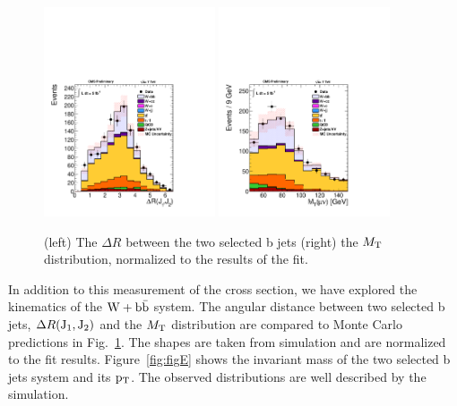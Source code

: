 
\begin{figure}
\centering
\includegraphics[width=0.45\textwidth]{Wbb/fig5.pdf}
\includegraphics[width=0.45\textwidth]{Wbb/fig6.pdf}
\caption{(left) The $\Delta R$ between the two selected b jets
(right) the $M_\mathrm{T}$ distribution, normalized to the results of the fit.}
\label{fig:figD}
\end{figure}

In addition to this measurement of the cross section, we have explored the kinematics of the $\mathrm{W+\mathrm{b\bar{b}}}$ system.
The angular distance between two selected b jets, $\Delta R(\rm{J_1,J_2})$ 
and the $M_\mathrm{T}$ distribution are compared to Monte Carlo predictions 
in Fig.~\ref{fig:figD}. The shapes are taken from simulation and are normalized to the fit results. 
Figure~\ref{fig:figE} shows the invariant mass of the two 
selected b jets system and its $\mathrm{p_{T}}$.
The observed distributions  are well described by the simulation.


